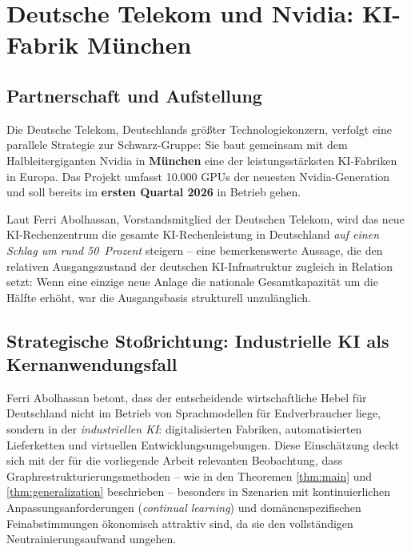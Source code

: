 ﻿\documentclass[12pt, a4paper, openany]{report}
\begin{document}
\section{Deutsche Telekom und Nvidia: KI-Fabrik München}
\label{sec:telekom_nvidia}

\subsection{Partnerschaft und Aufstellung}

Die Deutsche Telekom, Deutschlands größter Technologiekonzern, verfolgt
eine parallele Strategie zur Schwarz-Gruppe: Sie baut gemeinsam mit dem
Halbleitergiganten Nvidia in \textbf{München} eine der leistungsstärksten
KI-Fabriken in Europa. Das Projekt umfasst 10.000 GPUs der neuesten
Nvidia-Generation und soll bereits im \textbf{ersten Quartal 2026} in
Betrieb gehen.

Laut Ferri Abolhassan, Vorstandsmitglied der Deutschen Telekom, wird das
neue KI-Rechenzentrum die gesamte KI-Rechenleistung in Deutschland
\emph{auf einen Schlag um rund 50~Prozent} steigern -- eine bemerkenswerte
Aussage, die den relativen Ausgangszustand der deutschen KI-Infrastruktur
zugleich in Relation setzt: Wenn eine einzige neue Anlage die nationale
Gesamtkapazität um die Hälfte erhöht, war die Ausgangsbasis strukturell
unzulänglich.

\subsection{Strategische Stoßrichtung: Industrielle KI als Kernanwendungsfall}

Ferri Abolhassan betont, dass der entscheidende wirtschaftliche Hebel für
Deutschland nicht im Betrieb von Sprachmodellen für Endverbraucher liege,
sondern in der \emph{industriellen KI}: digitalisierten Fabriken,
automatisierten Lieferketten und virtuellen Entwicklungsumgebungen. Diese
Einschätzung deckt sich mit der für die vorliegende Arbeit relevanten
Beobachtung, dass Graphrestrukturierungsmethoden -- wie in den Theoremen
\ref{thm:main} und \ref{thm:generalization} beschrieben -- besonders in
Szenarien mit kontinuierlichen Anpassungsanforderungen
(\textit{continual learning}) und domänenspezifischen Feinabstimmungen
ökonomisch attraktiv sind, da sie den vollständigen Neutrainierungsaufwand
umgehen.
\end{document}
